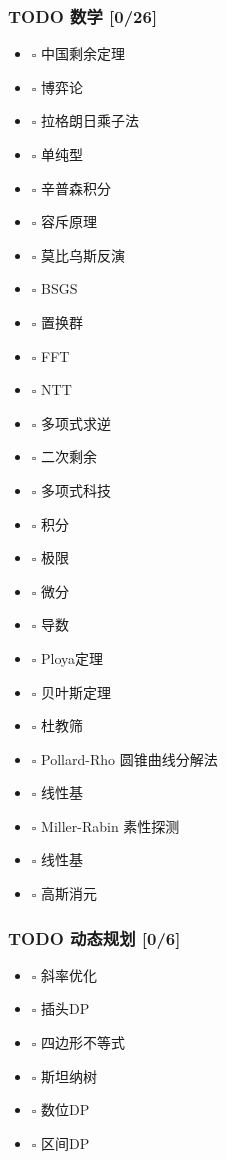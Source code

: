 \documentclass[11pt]{article}
\begin{document}
\subsubsection{{\bfseries\sffamily TODO} 数学 [0/26]}
\label{sec-1-1-3}

\begin{itemize}
\item $\square$ 中国剩余定理
\item $\square$ 博弈论
\item $\square$ 拉格朗日乘子法
\item $\square$ 单纯型
\item $\square$ 辛普森积分
\item $\square$ 容斥原理
\item $\square$ 莫比乌斯反演
\item $\square$ BSGS
\item $\square$ 置换群
\item $\square$ FFT
\item $\square$ NTT
\item $\square$ 多项式求逆
\item $\square$ 二次剩余
\item $\square$ 多项式科技
\item $\square$ 积分
\item $\square$ 极限
\item $\square$ 微分
\item $\square$ 导数
\item $\square$ Ploya定理
\item $\square$ 贝叶斯定理
\item $\square$ 杜教筛
\item $\square$ Pollard-Rho 圆锥曲线分解法
\item $\square$ 线性基
\item $\square$ Miller-Rabin 素性探测
\item $\square$ 线性基
\item $\square$ 高斯消元
\end{itemize}

\subsubsection{{\bfseries\sffamily TODO} 动态规划 [0/6]}
\label{sec-1-1-4}

\begin{itemize}
\item $\square$ 斜率优化
\item $\square$ 插头DP
\item $\square$ 四边形不等式
\item $\square$ 斯坦纳树
\item $\square$ 数位DP
\item $\square$ 区间DP
\end{itemize}
\end{document}
